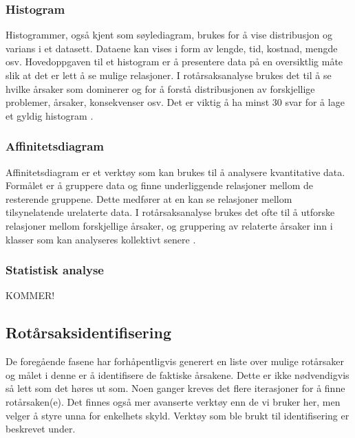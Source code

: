 \subsubsection{Histogram}
Histogrammer, også kjent som søylediagram, brukes for å vise distribusjon og varians i et datasett. Dataene kan vises i form av lengde, tid, kostnad, mengde osv. Hovedoppgaven til et histogram er å presentere data på en oversiktlig måte slik at det er lett å se mulige relasjoner. I rotårsaksanalyse brukes det til å se hvilke årsaker som dominerer og for å forstå distribusjonen av forskjellige problemer, årsaker, konsekvenser osv. \cite{RCA} Det er viktig å ha minst 30 svar for å lage et gyldig histogram \cite{RCA}.

\subsubsection{Affinitetsdiagram}
Affinitetsdiagram er et verktøy som kan brukes til å analysere kvantitative data. Formålet er å gruppere data og finne underliggende relasjoner mellom de resterende gruppene. Dette medfører at en kan se relasjoner mellom tilsynelatende urelaterte data. I rotårsaksanalyse brukes det ofte til å utforske relasjoner mellom forskjellige årsaker, og gruppering av relaterte årsaker inn i klasser som kan analyseres kollektivt senere \cite{RCA}. 

\subsubsection{Statistisk analyse}
KOMMER!

\subsection{Rotårsaksidentifisering}
De foregående fasene har forhåpentligvis generert en liste over mulige rotårsaker og målet i denne er å identifisere de faktiske årsakene. Dette er ikke nødvendigvis så lett som det høres ut som. Noen ganger kreves det flere iterasjoner for å finne rotårsaken(e). Det finnes også mer avanserte verktøy enn de vi bruker her, men velger å styre unna for enkelhets skyld. Verktøy som ble brukt til identifisering er beskrevet under. 


